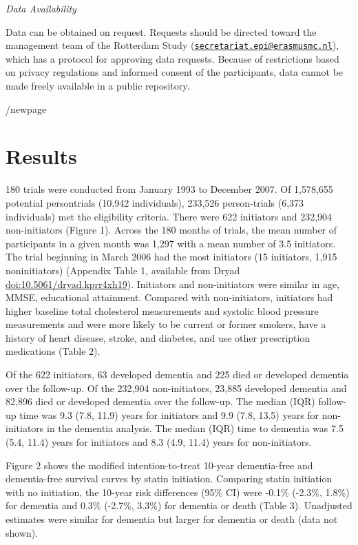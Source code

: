 \documentclass[
]{book}
\begin{document}
\emph{Data Availability}

Data can be obtained on request. Requests should be directed toward the management team of the Rotterdam Study (\href{mailto:secretariat.epi@erasmusmc.nl}{\nolinkurl{secretariat.epi@erasmusmc.nl}}), which has a protocol for approving data requests. Because of restrictions based on privacy regulations and informed consent of the participants, data cannot be made freely available in a public repository.

/newpage

\hypertarget{results}{%
\section{Results}\label{results}}

180 trials were conducted from January 1993 to December 2007. Of 1,578,655 potential persontrials (10,942 individuals), 233,526 person-trials (6,373 individuals) met the eligibility criteria. There were 622 initiators and 232,904 non-initiators (Figure 1). Across the 180 months of trials, the mean number of participants in a given month was 1,297 with a mean number of 3.5 initiators. The trial beginning in March 2006 had the most initiators (15 initiators, 1,915 noninitiators) (Appendix Table 1, available from Dryad \url{doi:10.5061/dryad.kprr4xh19}). Initiators and non-initiators were similar in age, MMSE, educational attainment. Compared with non-initiators, initiators had higher baseline total cholesterol measurements and systolic blood pressure measurements and were more likely to be current or former smokers, have a history of heart disease, stroke, and diabetes, and use other prescription medications (Table 2).

Of the 622 initiators, 63 developed dementia and 225 died or developed dementia over the follow-up. Of the 232,904 non-initiators, 23,885 developed dementia and 82,896 died or developed dementia over the follow-up. The median (IQR) follow-up time was 9.3 (7.8, 11.9) years for initiators and 9.9 (7.8, 13.5) years for non-initiators in the dementia analysis. The median (IQR) time to dementia was 7.5 (5.4, 11.4) years for initiators and 8.3 (4.9, 11.4) years for non-initiators.

Figure 2 shows the modified intention-to-treat 10-year dementia-free and dementia-free survival curves by statin initiation. Comparing statin initiation with no initiation, the 10-year risk differences (95\% CI) were -0.1\% (-2.3\%, 1.8\%) for dementia and 0.3\% (-2.7\%, 3.3\%) for dementia or death (Table 3). Unadjusted estimates were similar for dementia but larger for dementia or death (data not shown).
\end{document}
